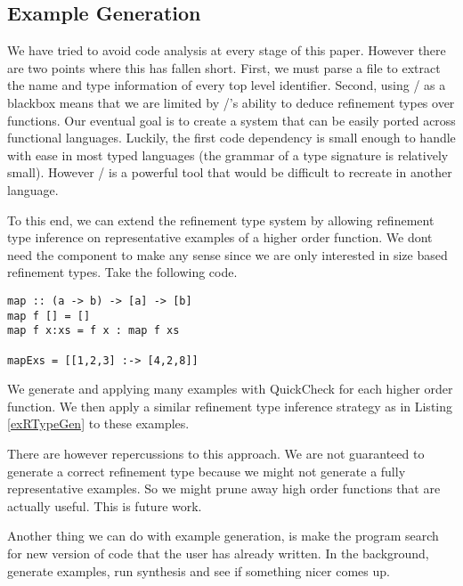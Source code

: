 \subsection{Example Generation}\label{languageSupport}

We have tried to avoid code analysis at every stage of this paper. However there are two points where this has fallen short. First, we must parse a file to extract the name and type information of every top level identifier. Second, using \lhask/ as a blackbox means that we are limited by \lhask/'s ability to deduce refinement types over functions. Our eventual goal is to create a system that can be easily ported across functional languages. Luckily, the first code dependency is small enough to handle with ease in most typed languages (the grammar of a type signature is relatively small). However \lhask/ is a powerful tool that would be difficult to recreate in another language. 

To this end, we can extend the refinement type system by allowing refinement type inference on representative examples of a higher order function. We dont need the component to make any sense since we are only interested in size based refinement types. Take the following code.

\begin{lstlisting}
map :: (a -> b) -> [a] -> [b]
map f [] = [] 
map f x:xs = f x : map f xs

mapExs = [[1,2,3] :-> [4,2,8]]
 \end{lstlisting}

We generate and applying many examples with QuickCheck for each higher order function.
We then apply a similar refinement type inference strategy as in Listing \ref{exRTypeGen} to these examples.

There are however repercussions to this approach. We are not guaranteed to generate a correct refinement type because we might not generate a fully representative examples. So we might prune away high order functions that are actually useful. This is future work.

Another thing we can do with example generation, is make the program search for new version of code that the user has already written.
In the background, generate examples, run synthesis and see if something nicer comes up.

